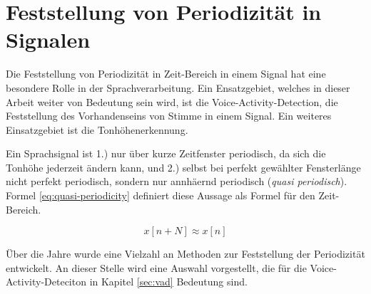 \section{Feststellung von Periodizität in Signalen}

Die Feststellung von Periodizität in Zeit-Bereich in einem Signal hat eine besondere Rolle in der Sprachverarbeitung. Ein Ensatzgebiet, welches in dieser Arbeit weiter von Bedeutung sein wird, ist die Voice-Activity-Detection, die Feststellung des Vorhandenseins von Stimme in einem Signal. \cite{vad_Lisboa} Ein weiteres Einsatzgebiet ist die Tonhöhenerkennung. \cite{pitch-paper-overview}  \cite[S. 1 - 2]{pitch_History}

Ein Sprachsignal ist 1.) nur über kurze Zeitfenster periodisch, da sich die Tonhöhe jederzeit ändern kann, und 2.) selbst bei \glqq perfekt gewählter Fensterlänge\grqq{} nicht perfekt periodisch, sondern nur annhäernd periodisch (\emph{quasi periodisch}).\cite[S. 1 - 2]{pitch_History} Formel \ref{eq:quasi-periodicity} definiert diese Aussage als Formel für den Zeit-Bereich.

\begin{equation}
 x[n+N] \approx x[n]
\label{eq:quasi-periodicity}
\end{equation}

Über die Jahre wurde eine Vielzahl an Methoden zur Feststellung der Periodizität entwickelt. An dieser Stelle wird eine Auswahl vorgestellt, die für die Voice-Activity-Deteciton in Kapitel \ref{sec:vad} Bedeutung sind.





